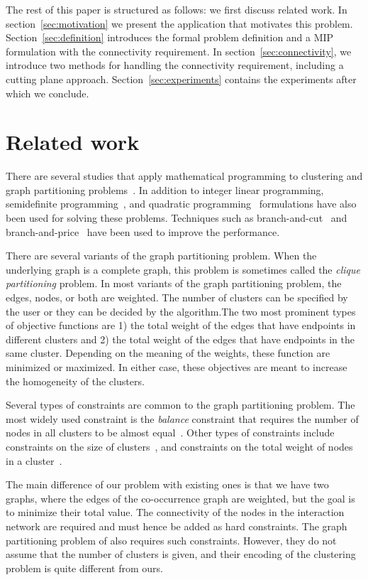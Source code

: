 \documentclass[conference]{IEEEtran}
\begin{document}
The rest of this paper is structured as follows: we first discuss related work. In
section~\ref{sec:motivation} we present the application that motivates
this problem.  Section~\ref{sec:definition} introduces the formal
problem definition and a MIP formulation with the connectivity requirement.
In section~\ref{sec:connectivity}, we introduce two methods for handling the connectivity requirement, including a cutting plane approach. Section~\ref{sec:experiments} contains the experiments after which we conclude.


\section{Related work}
\label{sec:related}
There are several studies that apply mathematical programming to clustering and graph partitioning
problems~\cite{HansenJ97}. In addition to integer linear programming, semidefinite programming~\cite{ArmbrusterFHM08,LisserR03}, and quadratic programming~\cite{FanP10} formulations have also been used for solving these problems. Techniques such as branch-and-cut~\cite{FerreiraMSWW98,GrotschelW89} and branch-and-price~\cite{MehrotraT98,JiM07} have been used to improve the performance. 

There are several variants of the graph partitioning problem. When the underlying graph is a complete graph, this problem is sometimes called the \emph{clique partitioning} problem. In most variants of the graph partitioning problem, the edges, nodes, or both are weighted. The number of clusters can be specified by the user or they can be decided by the algorithm.The two most prominent types of objective functions are 1) the total weight of the edges that have endpoints in different clusters and 2) the total weight of the edges that have endpoints in the same cluster. Depending on the meaning of the weights, these function are minimized or maximized. In either case, these objectives are meant to increase the homogeneity of the clusters.

Several types of constraints are common to the graph partitioning problem. The most widely used constraint is the \emph{balance} constraint that requires the number of nodes in all clusters to be almost equal~\cite{LabbeO10}. Other types of constraints include constraints on the size of clusters~\cite{FanP10}, and constraints on the total weight of nodes in a cluster~\cite{FerreiraMSWW98}. 

The main difference of our problem with existing ones is that we have two graphs, where the edges of the co-occurrence graph are weighted, but the goal is to minimize their total value. The connectivity of the nodes in the interaction network are required and must hence be added as hard constraints. The graph partitioning problem of \cite{Benati2017} also requires such constraints. However, they do not assume that the number of clusters is given, and their encoding of the clustering problem is quite different from ours. 
\end{document}
